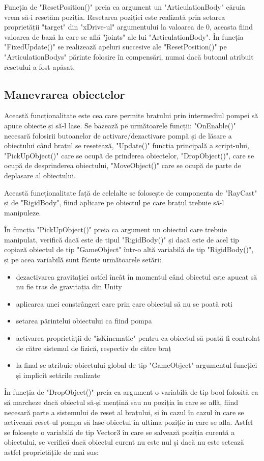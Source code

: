 Funcția de "ResetPosition()" preia ca argument un "ArticulationBody" căruia vrem să-i resetăm poziția. Resetarea poziției este realizată prin setarea proprietății "target" din "xDrive-ul" argumentului la valoarea de 0, aceasta fiind valoarea de bază la care se află "joints" ale lui "ArticulationBody".
În funcția "FixedUpdate()" se realizează apeluri succesive ale "ResetPosition()" pe "ArticulationBodys"  părinte folosire în compensări, numai dacă butonul atribuit resetului a fost apăsat.


\subsection{Manevrarea obiectelor}
Această funcționalitate este cea care permite brațului prin intermediul pompei să apuce obiecte și să-l lase. Se bazează pe următoarele funcții: "OnEnable()" necesară folosirii butoanelor de activare/dezactivare pompă și de lăsare a obiectului când brațul se resetează, "Update()" funcția principală a script-ului, "PickUpObject()" care se ocupă de prinderea obiectelor, "DropObject()", care se ocupă de desprinderea obiectului, "MoveObject()" care se ocupă de parte de deplasare al obiectului.

Această funcționalitate față de celelalte se folosește de componenta de "RayCast" și de "RigidBody", fiind aplicare pe obiectul pe care brațul trebuie să-l manipuleze.

În funcția "PickUpObject()" preia ca argument un obiectul care trebuie manipulat, verifică dacă este de tipul "RigidBody()" și dacă este de acel tip copiază obiectul de tip "GameObject" într-o altă variabilă de tip "RigidBody()", și pe acea variabilă sunt făcute următoarele setări: 
\begin{itemize}
	\item dezactivarea gravitației astfel încât în momentul când obiectul este apucat să nu fie tras de gravitația din Unity
	\item aplicarea unei constrângeri care prin care obiectul să nu se poată roti
	\item setarea părintelui obiectului ca fiind pompa
	\item activarea proprietății de "isKinematic" pentru ca obiectul să poată fi controlat de către sistemul de fizică, respectiv de către braț
	\item la final se atribuie obiectului global de tip "GameObject" argumentul funcției și implicit setările realizate
\end{itemize}
În funcția de "DropObject()" preia ca argument o variabilă de tip bool folosită ca să marcheze dacă obiectul să-și mențină sau nu poziția în care se află, fiind necesară parte a sistemului de reset al brațului, și în cazul în cazul în care se activează reset-ul pompa să lase obiectul în ultima poziție în care se afla. Astfel se folosește o variabilă de tip Vector3 în care se salvează poziția curentă a obiectului, se verifică dacă obiectul curent nu este nul și dacă nu este setează astfel proprietățile de mai sus:

